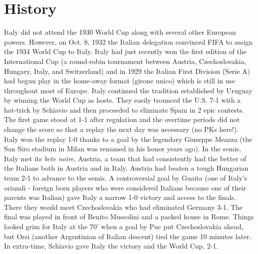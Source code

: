 \section{History}
Italy did not attend the 1930 World Cup along with several other European 
powers.  However, on Oct. 8, 1932 the Italian delegation convinced FIFA to  
assign the 1934 World Cup to Italy. Italy had just recently won the first
edition of the International Cup (a round-robin tournament between Austria,
Czechoslovakia, Hungary, Italy, and Switzerland) and in 1929 the Italian
First Division (Serie A) had begun play in the home-away format (girone
unico) which is still in use throughout most of Europe. Italy continued the
tradition established by Uruguay by winning the World Cup as hosts. They
easily trounced the U.S. 7-1 with a hat-trick by Schiavio and then proceeded
to eliminate Spain in 2 epic contests. The first game stood at 1-1 after
regulation and the overtime periods did not change the score so that a 
replay the next day was necessary (no PKs here!). Italy won the replay 1-0 
thanks to a goal by the legendary Giuseppe Meazza (the San Siro stadium in 
Milan was renamed in his honor years ago). In the semis, Italy met its \textit{bete 
noire}, Austria, a team that had consistently had the better of the Italians 
both in Austria and in Italy. Austria had beaten a tough Hungarian team 2-1 to 
advance to the semis. A controversial goal by Guaita (one of Italy's oriundi - 
foreign born players who were considered Italians because one of their parents 
was Italian) gave Italy a narrow 1-0 victory and access to the finals. There 
they would meet Czechoslovakia who had eliminated Germany 3-1. The final was 
played in front of Benito Mussolini and a packed house in Rome. Things looked 
grim for Italy at the 70' when a goal by Puc put Czechoslovakia ahead, but Orsi
(another Argentinian of Italian descent) tied the game 10 minutes later. In 
extra-time, Schiavio gave Italy the victory and the World Cup, 2-1.


